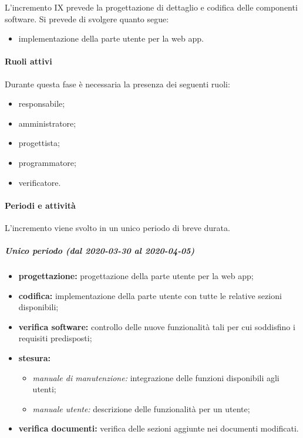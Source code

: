 			L'incremento IX prevede la progettazione di dettaglio e codifica delle componenti software. Si prevede di svolgere quanto segue:
			\begin{itemize}
				\item implementazione della parte utente per la web app.
			\end{itemize}
			
			\paragraph{Ruoli attivi}
			
				Durante questa fase è necessaria la presenza dei seguenti ruoli:
				\begin{itemize}
					\item responsabile;
					\item amministratore;
					\item progettista;
					\item programmatore;
					\item verificatore.
				\end{itemize}
			
			\paragraph{Periodi e attività}
			
				L'incremento viene svolto in un unico periodo di breve durata.
				
				\subparagraph{Unico periodo (dal 2020-03-30 al 2020-04-05)}
				
					\begin{itemize}
						\item \textbf{progettazione:} progettazione della parte utente per la web app;
						\item \textbf{codifica:} implementazione della parte utente con tutte le relative sezioni disponibili;
						\item \textbf{verifica software:} controllo delle nuove funzionalità tali per cui soddisfino i requisiti predisposti;
						\item \textbf{stesura:} 
							\begin{itemize}
								\item \textit{manuale di manutenzione:} integrazione delle funzioni disponibili agli utenti;
								\item \textit{manuale utente:} descrizione delle funzionalità per un utente;
							\end{itemize}
						\item \textbf{verifica documenti:} verifica delle sezioni aggiunte nei documenti modificati.
					\end{itemize} 			

